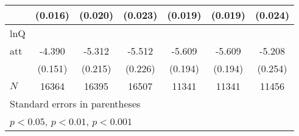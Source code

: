 {\begin{tabular}{l*{6}{c}}
            &     (0.016)         &     (0.020)         &     (0.023)         &     (0.019)         &     (0.019)         &     (0.024)         \\
\hline
lnQ         &                     &                     &                     &                     &                     &                     \\
att         &      -4.390\sym{***}&      -5.312\sym{***}&      -5.512\sym{***}&      -5.609\sym{***}&      -5.609\sym{***}&      -5.208\sym{***}\\
            &     (0.151)         &     (0.215)         &     (0.226)         &     (0.194)         &     (0.194)         &     (0.254)         \\
\hline
\(N\)       &       16364         &       16395         &       16507         &       11341         &       11341         &       11456         \\
\hline\hline
\multicolumn{7}{l}{\footnotesize Standard errors in parentheses}\\
\multicolumn{7}{l}{\footnotesize \sym{*} \(p<0.05\), \sym{**} \(p<0.01\), \sym{***} \(p<0.001\)}\\
\end{tabular}
}
